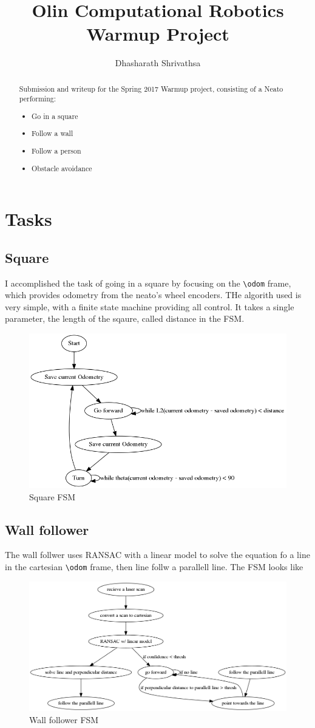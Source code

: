 \documentclass[]{article}
\title{Olin Computational Robotics Warmup Project}
\author{Dhasharath Shrivathsa}
\begin{document}
\maketitle

\begin{abstract}
Submission and writeup for the Spring 2017 Warmup project, consisting of a Neato performing:
\begin{itemize}
	\item Go in a square
	\item Follow a wall
	\item Follow a person
	\item Obstacle avoidance
\end{itemize}
\end{abstract}
\section{Tasks}
\subsection{Square}
I accomplished the task of going in a square by focusing on the \verb$\odom$ frame, which provides odometry from the neato's wheel encoders. THe algorith used is very simple, with a finite state machine providing all control. It takes a single parameter, the length of the sqaure, called distance in the FSM.
\begin{figure}[H]
	\centering
	\includegraphics[width=0.7\linewidth]{square}
	\caption{Square FSM}
	\label{fig:square}
\end{figure}

\subsection{Wall follower}
The wall follwer uses RANSAC with a linear model to solve the equation fo a line in the cartesian \verb|\odom| frame, then line follw a parallell line. 
The FSM looks like
\begin{figure}[H]
	\centering
	\includegraphics[width=0.7\linewidth]{wall_follower}
	\caption{Wall follower FSM}
	\label{fig:wallfollower}
\end{figure}
\end{document}
